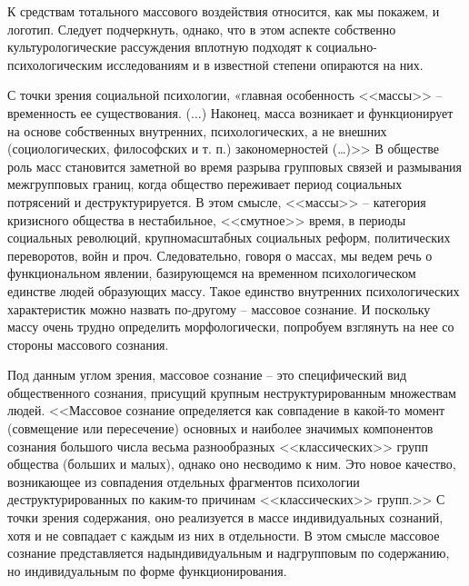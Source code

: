 К средствам тотального массового воздействия относится, как мы покажем, и логотип. Следует подчеркнуть, однако, что в этом аспекте собственно культурологические рассуждения вплотную подходят к социально-психологическим исследованиям и в известной степени опираются на них.

С точки зрения социальной психологии,  «главная особенность <<массы>> -- временность ее существования. ($\ldots$)
Наконец, масса возникает и функционирует на основе собственных внутренних, психологических,
а не внешних (социологических, философских и т. п.) закономерностей (\ldots)>>\autocite{olshansky}
В обществе роль масс становится заметной во время разрыва групповых связей и размывания
межгрупповых границ, когда общество переживает период социальных потрясений и деструктурируется.
В этом смысле, <<массы>> -- категория кризисного общества в нестабильное, <<смутное>> время, в периоды
социальных революций, крупномасштабных социальных реформ,
политических переворотов, войн и проч. Следовательно, говоря о массах, мы ведем речь о функциональном явлении,
базирующемся на временном психологическом единстве людей образующих массу. Такое единство внутренних психологических
характеристик можно назвать по-другому -- массовое сознание. И поскольку массу очень трудно определить морфологически,
попробуем взглянуть на нее со стороны массового сознания.

Под данным углом зрения, массовое сознание -- это специфический вид общественного сознания, присущий крупным
неструктурированным множествам людей. <<Массовое сознание определяется как совпадение в какой-то момент
(совмещение или пересечение) основных и наиболее значимых компонентов сознания большого числа весьма
разнообразных <<классических>> групп общества (больших и малых), однако оно несводимо к ним. Это новое качество,
возникающее из совпадения отдельных фрагментов психологии деструктурированных по каким-то причинам <<классических>>
групп.>>\autocite{olshansky} С точки зрения содержания, оно реализуется в массе индивидуальных сознаний,
хотя и не совпадает с каждым из них в отдельности. В этом смысле массовое сознание представляется надындивидуальным
и надгрупповым по содержанию, но индивидуальным по форме функционирования.


